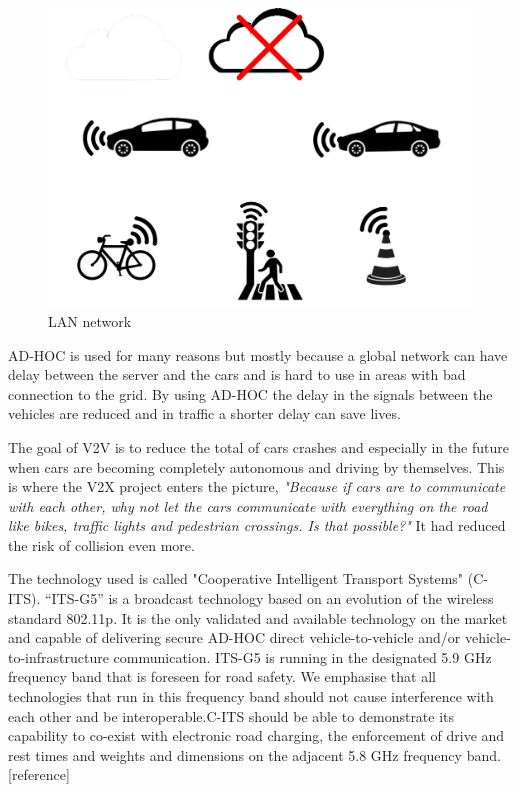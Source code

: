 \begin{figure}[H]
    \centering
    \includegraphics[scale=0.4]{images/projektsketch.jpg}
    \caption{LAN network}
\end{figure}

AD-HOC is used for many reasons but mostly because a global network can have delay between the server and the cars and is hard to use in areas with bad connection to the grid. By using AD-HOC the delay in the signals between the vehicles are reduced and in traffic a shorter delay can save lives.
\bigskip

The goal of V2V is to reduce the total of cars crashes and especially in the future when cars are becoming completely autonomous and driving by themselves. This is where the V2X project enters the picture, \textit{"Because if cars are to communicate with each other, why not let the cars communicate with everything on the road like bikes, traffic lights and pedestrian crossings. Is that possible?"} It had reduced the risk of collision even more.
\bigskip

The technology used is called "Cooperative Intelligent Transport Systems" (C-ITS).  “ITS-G5” is a broadcast technology based on an evolution of the wireless standard 802.11p. It is the only validated and available technology on the market and capable of delivering secure AD-HOC direct vehicle-to-vehicle and/or vehicle-to-infrastructure communication. ITS-G5 is running in the designated 5.9 GHz frequency band that is foreseen for road safety. We emphasise that all technologies that run in this frequency band should not cause interference with each other and be interoperable.C-ITS should be able to demonstrate its capability to co-exist with electronic road charging, the enforcement of drive and rest times and weights and dimensions on the adjacent 5.8 GHz frequency band. [reference]
